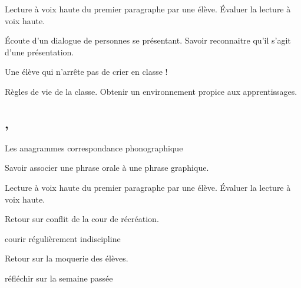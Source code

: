 \documentclass{article}
\begin{document}
	\Dis\cfr{} Lecture à voix haute du premier paragraphe par une élève.
	\obj Évaluer la lecture à voix haute.
			
	\Dis\cen{} Écoute d’un dialogue de personnes se présentant.
	\obj Savoir reconnaitre qu’il s’agit d’une présentation.
	
	\dIs\cge{} Une élève qui n’arrête pas de crier en classe !

	\dIs\cge{} Règles de vie de la classe.
	\obj Obtenir un environnement propice aux apprentissages.
	
	
	\subsection{ \sep}
	\dis\cfr{}
	 Les anagrammes
	\obj correspondance phonographique
	
	
	\Dis\cen{}
	\obj Savoir associer une phrase orale à une phrase graphique.
	
	\dis\cfr{} Lecture à voix haute du premier paragraphe par une élève.
	\obj Évaluer la lecture à voix haute.
	
	
	\dIs\cge{} Retour sur conflit de la cour de récréation.
	
	\Dis\csp{}
	\obj courir régulièrement
	\bil indiscipline
	
	\Dis\chg{} Retour sur la moquerie des élèves.
	
	\Dis\chg{}
	\obj réfléchir sur la semaine passée
	
	
	
	
	
	
	
\end{document}

